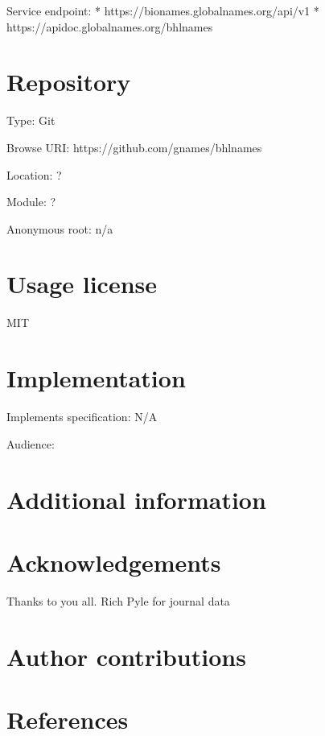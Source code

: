 \documentclass[
]{article}
\begin{document}
Service endpoint: * https://bionames.globalnames.org/api/v1 *
https://apidoc.globalnames.org/bhlnames

\hypertarget{repository}{%
\section{Repository}\label{repository}}

Type: Git

Browse URI: https://github.com/gnames/bhlnames

Location: ?

Module: ?

Anonymous root: n/a

\hypertarget{usage-license}{%
\section{Usage license}\label{usage-license}}

MIT

\hypertarget{implementation}{%
\section{Implementation}\label{implementation}}

Implements specification: N/A

Audience:

\hypertarget{additional-information}{%
\section{Additional information}\label{additional-information}}

\hypertarget{acknowledgements}{%
\section{Acknowledgements}\label{acknowledgements}}

Thanks to you all. Rich Pyle for journal data

\hypertarget{author-contributions}{%
\section{Author contributions}\label{author-contributions}}

\hypertarget{references}{%
\section{References}\label{references}}
\end{document}
